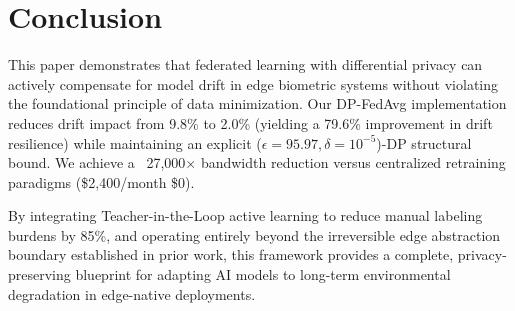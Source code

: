 \documentclass[conference]{IEEEtran}
\begin{document}
\section{Conclusion}

This paper demonstrates that federated learning with differential privacy can actively compensate for model drift in edge biometric systems without violating the foundational principle of data minimization. Our DP-FedAvg implementation reduces drift impact from 9.8\% to 2.0\% (yielding a 79.6\% improvement in drift resilience) while maintaining an explicit ($\epsilon=95.97, \delta=10^{-5}$)-DP structural bound. We achieve a ~27,000$\times$ bandwidth reduction versus centralized retraining paradigms (\$2,400/month \textrightarrow \$0). 

By integrating Teacher-in-the-Loop active learning to reduce manual labeling burdens by 85\%, and operating entirely beyond the irreversible edge abstraction boundary established in prior work, this framework provides a complete, privacy-preserving blueprint for adapting AI models to long-term environmental degradation in edge-native deployments.
\end{document}
